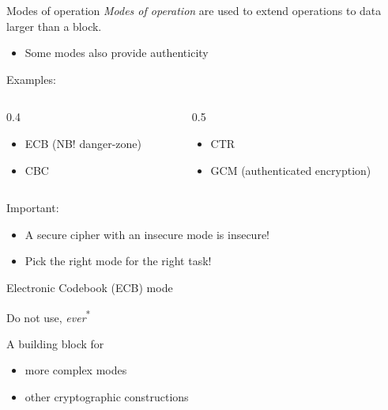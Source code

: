 \begin{frame}{Modes of operation}
  \pause
  \emph{Modes of operation} are used to extend operations to data larger than a block.
  \begin{itemize}[<+(1)->]
    \item Some modes also provide authenticity
  \end{itemize}

  \vspace*{0.5em}

  \pause
  Examples:
  \begin{columns}
    \begin{column}{0.4\textwidth}
      \begin{itemize}[<+(1)->]
        \item ECB (NB! danger-zone)
        \item CBC
      \end{itemize}
    \end{column}
    \begin{column}{0.5\textwidth}
      \begin{itemize}[<+(1)->]
        \item CTR
        \item GCM (authenticated encryption)
      \end{itemize}
    \end{column}
  \end{columns}

  \vspace*{1em}

  \pause
  Important:
  \begin{itemize}[<+(1)->]
    \item A secure cipher with an insecure mode is insecure!
    \item Pick the right mode for the right task!
  \end{itemize}  
\end{frame}

\begin{frame}{Electronic Codebook (ECB) mode}
  \begin{center}
  \end{center}

  \pause
  Do not use, \emph{ever}\textsuperscript{*}

  \pause
  A building block for
  \begin{itemize}[<+->]
    \item more complex modes
    \item other cryptographic constructions
  \end{itemize}
\end{frame}

